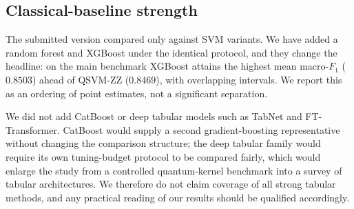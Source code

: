 \subsection{Classical-baseline strength}
\begin{revbody}

The submitted version compared only against SVM variants. We have added a
random forest and XGBoost under the identical protocol, and they change the
headline: on the main benchmark XGBoost attains the highest mean macro-$F_1$
($0.8503$) ahead of QSVM-ZZ ($0.8469$), with overlapping intervals. We report
this as an ordering of point estimates, not a significant separation.

We did not add CatBoost or deep tabular models such as TabNet and
FT-Transformer. CatBoost would supply a second gradient-boosting representative
without changing the comparison structure; the deep tabular family would require
its own tuning-budget protocol to be compared fairly, which would enlarge the
study from a controlled quantum-kernel benchmark into a survey of tabular
architectures. We therefore do not claim coverage of all strong tabular methods,
and any practical reading of our results should be qualified accordingly.
\end{revbody}


